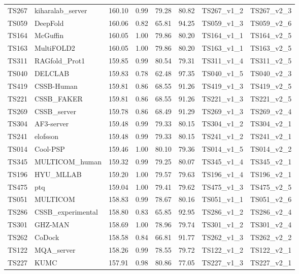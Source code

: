 \begin{longtable}{llllllll}
TS267 & kiharalab\_server & 160.10 & 0.99 & 79.28 & 80.82 & TS267\_v1\_2 & TS267\_v2\_3 \\ 
TS059 & DeepFold & 160.06 & 0.82 & 65.81 & 94.25 & TS059\_v1\_3 & TS059\_v2\_6 \\ 
TS164 & McGuffin & 160.05 & 1.00 & 79.86 & 80.20 & TS164\_v1\_1 & TS164\_v2\_5 \\ 
TS163 & MultiFOLD2 & 160.05 & 1.00 & 79.86 & 80.20 & TS163\_v1\_1 & TS163\_v2\_5 \\ 
TS311 & RAGfold\_Prot1 & 159.85 & 0.99 & 80.54 & 79.31 & TS311\_v1\_4 & TS311\_v2\_5 \\ 
TS040 & DELCLAB & 159.83 & 0.78 & 62.48 & 97.35 & TS040\_v1\_5 & TS040\_v2\_3 \\ 
TS419 & CSSB-Human & 159.81 & 0.86 & 68.55 & 91.26 & TS419\_v1\_3 & TS419\_v2\_5 \\ 
TS221 & CSSB\_FAKER & 159.81 & 0.86 & 68.55 & 91.26 & TS221\_v1\_3 & TS221\_v2\_5 \\ 
TS269 & CSSB\_server & 159.78 & 0.86 & 68.49 & 91.29 & TS269\_v1\_3 & TS269\_v2\_4 \\ 
TS304 & AF3-server & 159.48 & 0.99 & 79.33 & 80.15 & TS304\_v1\_2 & TS304\_v2\_1 \\ 
TS241 & elofsson & 159.48 & 0.99 & 79.33 & 80.15 & TS241\_v1\_2 & TS241\_v2\_1 \\ 
TS014 & Cool-PSP & 159.46 & 1.00 & 80.10 & 79.36 & TS014\_v1\_5 & TS014\_v2\_2 \\ 
TS345 & MULTICOM\_human & 159.32 & 0.99 & 79.25 & 80.07 & TS345\_v1\_4 & TS345\_v2\_1 \\ 
TS196 & HYU\_MLLAB & 159.20 & 1.00 & 79.57 & 79.63 & TS196\_v1\_4 & TS196\_v2\_1 \\ 
TS475 & ptq & 159.04 & 1.00 & 79.41 & 79.62 & TS475\_v1\_3 & TS475\_v2\_5 \\ 
TS051 & MULTICOM & 158.83 & 0.99 & 78.67 & 80.16 & TS051\_v1\_1 & TS051\_v2\_6 \\ 
TS286 & CSSB\_experimental & 158.80 & 0.83 & 65.85 & 92.95 & TS286\_v1\_2 & TS286\_v2\_4 \\ 
TS301 & GHZ-MAN & 158.69 & 1.00 & 78.96 & 79.74 & TS301\_v1\_2 & TS301\_v2\_4 \\ 
TS262 & CoDock & 158.58 & 0.84 & 66.81 & 91.77 & TS262\_v1\_3 & TS262\_v2\_2 \\ 
TS122 & MQA\_server & 158.26 & 0.99 & 78.55 & 79.72 & TS122\_v1\_2 & TS122\_v2\_1 \\ 
TS227 & KUMC & 157.91 & 0.98 & 80.86 & 77.05 & TS227\_v1\_3 & TS227\_v2\_1 \\ 

\end{longtable}
